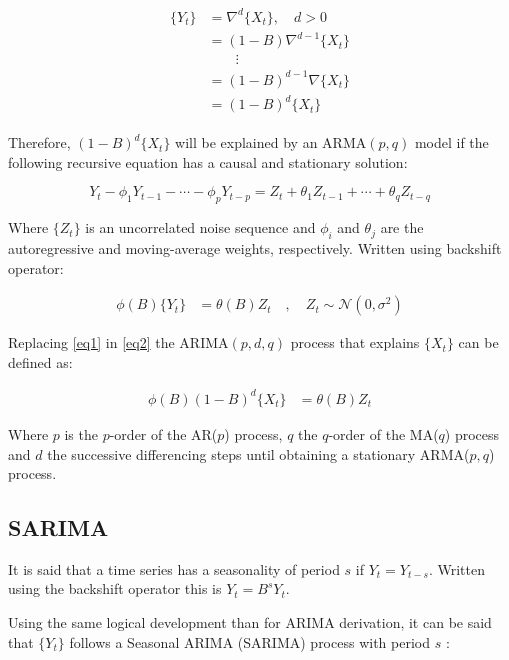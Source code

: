 \begin{align}\label{eq1}
	\begin{split}
		\{Y_t\} &= \nabla^d \{X_t\}, \quad d>0 \\
		&= (1-B)\nabla^{d-1}\{X_t\} \\
		& \quad\quad \vdots \\
		&= (1-B)^{d-1}\nabla\{X_t\} \\
		&= (1-B)^d \{X_t\} 
	\end{split}
\end{align}

Therefore, $(1-B)^d \{X_t\}$ will be explained by an $\text{ARMA}(p,q)$ model if the following recursive equation has a causal and stationary solution:

\begin{equation*}
	Y_t - \phi_1Y_{t-1} - \cdots - \phi_pY_{t-p} = Z_t + \theta_1Z_{t-1} + \cdots + \theta_qZ_{t-q}
\end{equation*}

Where $\{Z_t\}$ is an uncorrelated noise sequence and $\phi_i$ and $\theta_j$ are the autoregressive and moving-average weights, respectively. Written using backshift operator:

\begin{align}\label{eq2}
	\phi(B)\{Y_t\} &= \theta(B) Z_t \quad,\quad Z_t \sim \mathcal{N}(0,\sigma^2)
\end{align}

Replacing \ref{eq1} in \ref{eq2} the $\text{ARIMA}(p,d,q)$ process that explains $\{X_t\}$ can be defined as:

\begin{align}\label{eq:arima}
	\phi(B)(1-B)^d \{X_t\} &= \theta(B) Z_t
\end{align}

Where $p$ is the $p$-order of the AR($p$) process, $q$ the $q$-order of the MA($q$) process and $d$ the successive differencing steps until obtaining a stationary ARMA($p,q$) process.

\subsection{SARIMA}

It is said that a time series has a seasonality of period $s$ if $Y_t = Y_{t-s}$. Written using the backshift operator this is $Y_t = B^sY_t$.

Using the same logical development than for ARIMA derivation, it can be said that $\{Y_t\}$ follows a Seasonal ARIMA (SARIMA) process with period $s$ \cite{brockwell2016introduction} :

